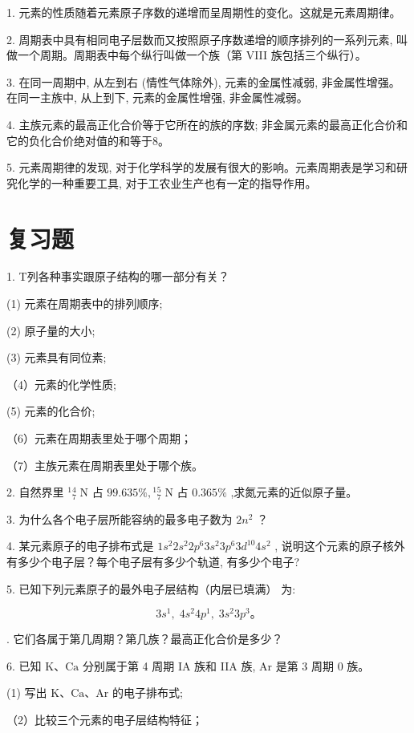 \documentclass[10pt]{article}
\begin{document}
1. 元素的性质随着元素原子序数的递增而呈周期性的变化。这就是元素周期律。

2. 周期表中具有相同电子层数而又按照原子序数递增的顺序排列的一系列元素, 叫做一个周期。周期表中每个纵行叫做一个族（第 VIII 族包括三个纵行）。

3. 在同一周期中, 从左到右 (情性气体除外), 元素的金属性减弱, 非金属性增强。在同一主族中, 从上到下, 元素的金属性增强, 非金属性减弱。

4. 主族元素的最高正化合价等于它所在的族的序数; 非金属元素的最高正化合价和它的负化合价绝对值的和等于8。

5. 元素周期律的发现, 对于化学科学的发展有很大的影响。元素周期表是学习和研究化学的一种重要工具, 对于工农业生产也有一定的指导作用。

\section*{复习题}

1. T列各种事实跟原子结构的哪一部分有关？

(1) 元素在周期表中的排列顺序;

(2) 原子量的大小;

(3) 元素具有同位素;

（4）元素的化学性质;

(5) 元素的化合价;

（6）元素在周期表里处于哪个周期；

（7）主族元素在周期表里处于哪个族。

2. 自然界里 \({}^{1}{}_{7}^{4}\mathrm{\;N}\) 占 \({99.635}\% ,{}^{1}{}_{7}^{5}\mathrm{\;N}\) 占 \({0.365}\%\) ,求氮元素的近似原子量。

3. 为什么各个电子层所能容纳的最多电子数为 \(2{n}^{2}\) ？

4. 某元素原子的电子排布式是 \(1{s}^{2}2{s}^{2}2{p}^{6}3{s}^{2}3{p}^{6}3{d}^{10}4{s}^{2}\) , 说明这个元素的原子核外有多少个电子层？每个电子层有多少个轨道, 有多少个电子?

5. 已知下列元素原子的最外电子层结构（内层已填满） 为:

\[
3{s}^{1},\;4{s}^{2}4{p}^{1},\;3{s}^{2}3{p}^{3}。
\]

. 它们各属于第几周期？第几族？最高正化合价是多少？

6. 已知 \(\mathrm{K}\text{、}\mathrm{{Ca}}\) 分别属于第 4 周期 IA 族和 IIA 族, \(\mathrm{{Ar}}\) 是第 3 周期 0 族。

(1) 写出 \(\mathrm{K}\text{、}\mathrm{{Ca}}\text{、}\mathrm{{Ar}}\) 的电子排布式;

（2）比较三个元素的电子层结构特征；
\end{document}
